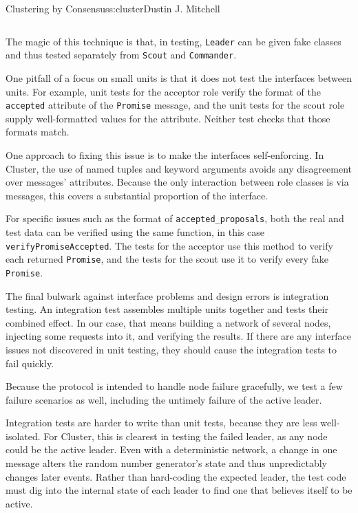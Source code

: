 \begin{aosachapter}{Clustering by Consensus}{s:cluster}{Dustin J. Mitchell}
\begin{verbatim}
\end{verbatim}

The magic of this technique is that, in testing, \texttt{Leader} can be
given fake classes and thus tested separately from \texttt{Scout} and
\texttt{Commander}.

\label{interface-correctness}

One pitfall of a focus on small units is that it does not test the
interfaces between units. For example, unit tests for the acceptor role
verify the format of the \texttt{accepted} attribute of the
\texttt{Promise} message, and the unit tests for the scout role supply
well-formatted values for the attribute. Neither test checks that those
formats match.

One approach to fixing this issue is to make the interfaces
self-enforcing. In Cluster, the use of named tuples and keyword
arguments avoids any disagreement over messages' attributes. Because the
only interaction between role classes is via messages, this covers a
substantial proportion of the interface.

For specific issues such as the format of \texttt{accepted\_proposals},
both the real and test data can be verified using the same function, in
this case \texttt{verifyPromiseAccepted}. The tests for the acceptor use
this method to verify each returned \texttt{Promise}, and the tests for
the scout use it to verify every fake \texttt{Promise}.

\label{integration-testing}

The final bulwark against interface problems and design errors is
integration testing. An integration test assembles multiple units
together and tests their combined effect. In our case, that means
building a network of several nodes, injecting some requests into it,
and verifying the results. If there are any interface issues not
discovered in unit testing, they should cause the integration tests to
fail quickly.

Because the protocol is intended to handle node failure gracefully, we
test a few failure scenarios as well, including the untimely failure of
the active leader.

Integration tests are harder to write than unit tests, because they are
less well-isolated. For Cluster, this is clearest in testing the failed
leader, as any node could be the active leader. Even with a
deterministic network, a change in one message alters the random number
generator's state and thus unpredictably changes later events. Rather
than hard-coding the expected leader, the test code must dig into the
internal state of each leader to find one that believes itself to be
active.


\end{aosachapter}
